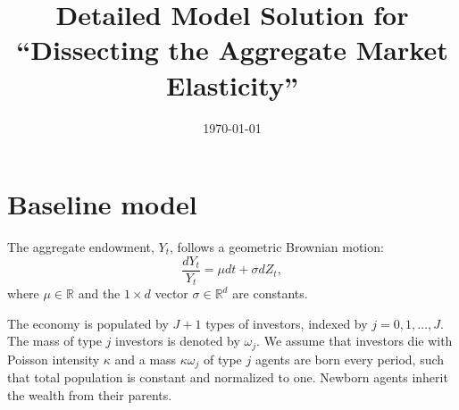 \usepackage[en-US]{datetime2}
\usepackage{mathtools}
\usepackage{xcolor}

\usepackage{amsmath}
\usepackage{tikz}
\usepackage{mathdots}
\usepackage{cancel}
\usepackage{color}
\usepackage{siunitx}
\usepackage{array}
\usepackage{multirow}
\usepackage{amssymb}
\usepackage{gensymb}
\usepackage{tabularx}
\usepackage{extarrows}
\usepackage{booktabs}
\usetikzlibrary{fadings}
\usetikzlibrary{patterns}
\usetikzlibrary{shadows.blur}
\usetikzlibrary{shapes}
\DeclareMathOperator{\tr}{tr}



\newcommand{\comments}[1]
{\par {\bfseries \color{blue} #1 \par}}


\title{\textbf{Detailed Model Solution for\\ ``Dissecting the Aggregate Market Elasticity''}}

\author{}
\date{\today}
\maketitle
\doublespacing
\section{Baseline model}
The aggregate endowment, $Y_t$, follows a geometric Brownian motion:
\begin{equation}\label{eq:agg_endow}
	\frac{d Y_t}{Y_t} = \mu dt + \sigma dZ_t,
\end{equation}
where $\mu\in\mathbb{R}$ and the $1\times d$ vector $\sigma\in\mathbb{R}^d$ are constants.

The economy is populated by $J+1$ types of investors, indexed by $j = 0, 1, \ldots, J$. The mass of type $j$ investors is denoted by $\omega_j$. We assume that investors die with Poisson intensity $\kappa$ and a mass $\kappa \omega_j$ of type $j$ agents are born every period, such that total population is constant and normalized to one. 
Newborn agents inherit the wealth from their parents.
